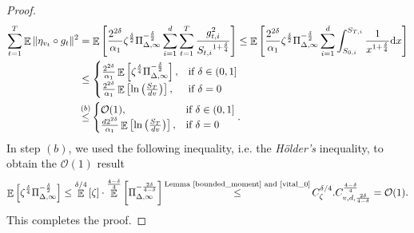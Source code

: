 \documentclass{article} %
\DeclareMathOperator{\Expect}{\mathbb{E}}
\begin{document}
\begin{proof}
\begin{align}\label{Gamma}
\sum_{t=1}^{T} \Expect\|\eta_{v_{t}}\circ g_{t}\|^{2}&=\Expect\left[\frac{2^{2\delta}}{\alpha_{1}}{\zeta}^{\frac{\delta}{2}}\Pi^{-\frac{\delta}{2}}_{\Delta,\infty}\sum_{i=1}^{d}\sum_{t=1}^{T}\frac{g_{t,i}^{2}}{{S_{t,i}}^{1+\frac{\delta}{4}}}\right]\le \Expect\left[\frac{2^{2\delta}}{\alpha_{1}}{\zeta}^{\frac{\delta}{2}}\Pi^{-\frac{\delta}{2}}_{\Delta,\infty}\sum_{i=1}^{d}\int_{S_{0,i}}^{S_{T,i}}\frac{1}{{x}^{1+\frac{\delta}{4}}}\text{d}x\right]\notag\\&\le \begin{cases} 
\frac{2^{2\delta}}{\alpha_{1}}\Expect\left[{\zeta}^{\frac{\delta}{4}}\Pi^{-\frac{\delta}{2}}_{\Delta,\infty}\right], & \text{if } \delta \in (0,1] \\
\frac{2^{2\delta}}{\alpha_{1}}\Expect\left[\ln\big(\frac{S_{T}}{dv}\big)\right], & \text{if } \delta = 0
\end{cases}\notag\\&\mathop{\le}^{(b)}\begin{cases} 
\mathcal{O}(1), & \text{if } \delta \in (0,1] \\
\frac{d2^{2\delta}}{\alpha_{1}}\Expect\left[\ln\big(\frac{S_{T}}{dv}\big)\right], & \text{if } \delta = 0
\end{cases}.
\end{align}
In step $(b)$, we used the following inequality, i.e. the \emph{Hölder's} inequality, to obtain the $\mathcal{O}(1)$ result
\[\Expect\left[{\zeta}^{\frac{\delta}{4}}\Pi^{-\frac{\delta}{2}}_{\Delta,\infty}\right]\le \Expect^{\delta/4}\left[\zeta\right]\cdot\Expect^{\frac{4-\delta}{4}}\left[\Pi^{-\frac{2\delta}{4-\delta}}_{\Delta,\infty}\right]\mathop{\le}^{\text{Lemma \ref{bounded_moment} and \ref{vital_0}}} C_{\zeta}^{\delta/4}.C_{v,d,\frac{2\delta}{4-\delta}}^{\frac{4-\delta}{4}}=\mathcal{O}(1).\]
This completes the proof.

\end{proof}
\end{document}
